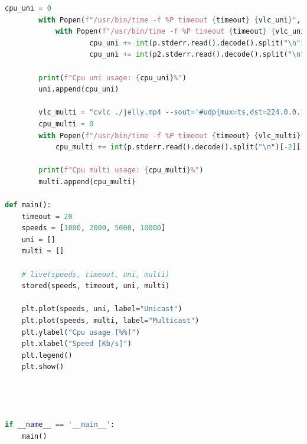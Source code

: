 \documentclass{exam}
\begin{document}
\begin{lstlisting}[language=python]
        cpu_uni = 0
        with Popen(f"/usr/bin/time -f %P timeout {timeout} {vlc_uni}", stderr=PIPE, shell=True) as p:
            with Popen(f"/usr/bin/time -f %P timeout {timeout} {vlc_uni2}", stderr=PIPE, shell=True) as p2:
                    cpu_uni += int(p.stderr.read().decode().split("\n")[-2][:-1])
                    cpu_uni += int(p2.stderr.read().decode().split("\n")[-2][:-1])

        print(f"Cpu uni usage: {cpu_uni}%")
        uni.append(cpu_uni)

        vlc_multi = "cvlc ./jelly.mp4 --sout='#udp{mux=ts,dst=224.0.0.1,sdp=sap,name=\"TestStream\"}' --loop"
        cpu_multi = 0
        with Popen(f"/usr/bin/time -f %P timeout {timeout} {vlc_multi}", stderr=PIPE, shell=True) as p:
            cpu_multi += int(p.stderr.read().decode().split("\n")[-2][:-1])

        print(f"Cpu multi usage: {cpu_multi}%")
        multi.append(cpu_multi)

def main():
    timeout = 20
    speeds = [1000, 2000, 5000, 10000]
    uni = []
    multi = []

    # live(speeds, timeout, uni, multi)
    stored(speeds, timeout, uni, multi)

    plt.plot(speeds, uni, label="Unicast")
    plt.plot(speeds, multi, label="Multicast")
    plt.ylabel("Cpu usage [%%]")
    plt.xlabel("Speed [Kb/s]")
    plt.legend()
    plt.show()
            

    

if __name__ == '__main__':
    main()
\end{lstlisting}
\end{document}
